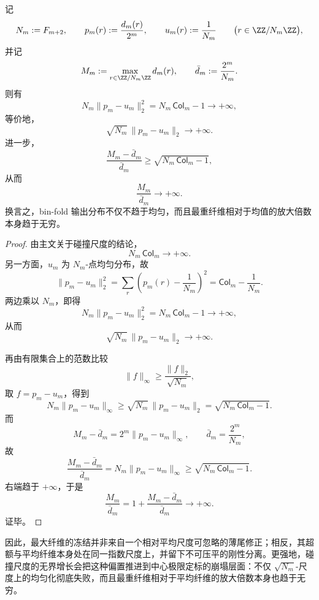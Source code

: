 \begin{theorem}[碰撞尺度无界增长强制中心极限定标下的彻底非均匀化]\label{thm:conclusion-binfold-collision-scale-forces-maxfiber-divergence}
记
\[
N_m:=F_{m+2},
\qquad
p_m(r):=\frac{d_m(r)}{2^m},
\qquad
u_m(r):=\frac1{N_m}
\qquad
\bigl(r\in \ZZ/N_m\ZZ\bigr),
\]
并记
\[
M_m:=\max_{r\in \ZZ/N_m\ZZ} d_m(r),
\qquad
\bar d_m:=\frac{2^m}{N_m}.
\]
则有
\[
N_m\|p_m-u_m\|_2^2
=
N_m\,\mathsf{Col}_m-1
\longrightarrow +\infty,
\]
等价地，
\[
\sqrt{N_m}\,\|p_m-u_m\|_2\longrightarrow +\infty.
\]
进一步，
\[
\frac{M_m-\bar d_m}{\bar d_m}
\ge
\sqrt{N_m\,\mathsf{Col}_m-1},
\]
从而
\[
\frac{M_m}{\bar d_m}\longrightarrow +\infty.
\]
换言之，bin-fold 输出分布不仅不趋于均匀，而且最重纤维相对于均值的放大倍数本身趋于无穷。
\end{theorem}
\begin{proof}
由主文关于碰撞尺度的结论，
\[
N_m\,\mathsf{Col}_m\longrightarrow +\infty.
\]
另一方面，\(u_m\) 为 \(N_m\)-点均匀分布，故
\[
\|p_m-u_m\|_2^2
=
\sum_{r}\left(p_m(r)-\frac1{N_m}\right)^2
=
\mathsf{Col}_m-\frac1{N_m}.
\]
两边乘以 \(N_m\)，即得
\[
N_m\|p_m-u_m\|_2^2=N_m\,\mathsf{Col}_m-1\to +\infty,
\]
从而
\[
\sqrt{N_m}\,\|p_m-u_m\|_2\to +\infty.
\]

再由有限集合上的范数比较
\[
\|f\|_\infty\ge \frac{\|f\|_2}{\sqrt{N_m}},
\]
取 \(f=p_m-u_m\)，得到
\[
N_m\|p_m-u_m\|_\infty
\ge
\sqrt{N_m}\,\|p_m-u_m\|_2
=
\sqrt{N_m\,\mathsf{Col}_m-1}.
\]
而
\[
M_m-\bar d_m
=
2^m\|p_m-u_m\|_\infty,
\qquad
\bar d_m=\frac{2^m}{N_m},
\]
故
\[
\frac{M_m-\bar d_m}{\bar d_m}
=
N_m\|p_m-u_m\|_\infty
\ge
\sqrt{N_m\,\mathsf{Col}_m-1}.
\]
右端趋于 \(+\infty\)，于是
\[
\frac{M_m}{\bar d_m}=1+\frac{M_m-\bar d_m}{\bar d_m}\longrightarrow +\infty.
\]
证毕。
\end{proof}

\noindent
因此，最大纤维的冻结并非来自一个相对平均尺度可忽略的薄尾修正；相反，其超额与平均纤维本身处在同一指数尺度上，并留下不可压平的刚性分离。更强地，碰撞尺度的无界增长会把这种偏置推进到中心极限定标的崩塌层面：不仅 \(\sqrt{N_m}\)-尺度上的均匀化彻底失败，而且最重纤维相对于平均纤维的放大倍数本身也趋于无穷。

\endinput
